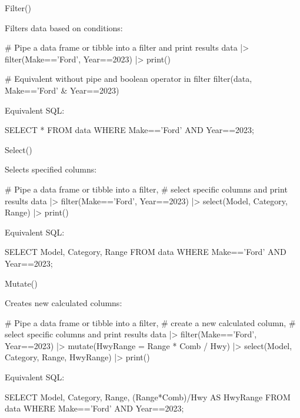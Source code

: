 \documentclass[ignorenonframetext,xcolor=x11names]{beamer}
\begin{document}
\begin{frame}[label=full,fragile]{Filter()}

Filters data based on conditions:

\begin{Rcode}
# Pipe a data frame or tibble into a filter and print results
data |> 
  filter(Make=='Ford', Year==2023) |> 
  print()

# Equivalent without pipe and boolean operator in filter
filter(data, Make=='Ford' & Year==2023)
\end{Rcode}

Equivalent SQL:

\begin{sqlcode}
SELECT * 
   FROM data 
   WHERE Make=='Ford' AND Year==2023;
\end{sqlcode}

\end{frame}

\begin{frame}[label=full,fragile]{Select()}

Selects specified columns:

\begin{Rcode}
# Pipe a data frame or tibble into a filter,
# select specific columns and print results
data |> 
  filter(Make=='Ford', Year==2023) |> 
  select(Model, Category, Range) |>
  print()
\end{Rcode}

Equivalent SQL:

\begin{sqlcode}
SELECT Model, Category, Range 
   FROM data 
   WHERE Make=='Ford' AND Year==2023;
\end{sqlcode}
\end{frame}

\begin{frame}[label=full,fragile]{Mutate()}

Creates new calculated columns:

\begin{Rcode}
# Pipe a data frame or tibble into a filter,
# create a new calculated column,
# select specific columns and print results
data |> 
  filter(Make=='Ford', Year==2023) |> 
  mutate(HwyRange = Range * Comb / Hwy) |>
  select(Model, Category, Range, HwyRange) |>
  print()
\end{Rcode}

Equivalent SQL:

\begin{sqlcode}
SELECT Model, Category, Range, (Range*Comb)/Hwy AS HwyRange 
   FROM data 
   WHERE Make=='Ford' AND Year==2023;
\end{sqlcode}
\end{frame}
\end{document}
